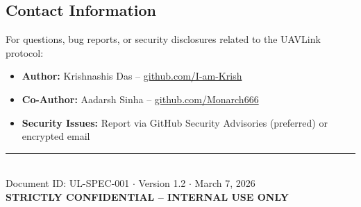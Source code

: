 \documentclass[11pt,a4paper]{article}
\begin{document}
\subsection*{Contact Information}

For questions, bug reports, or security disclosures related to the UAVLink protocol:

\begin{itemize}[noitemsep]
\item \textbf{Author:} Krishnashis Das -- \href{https://github.com/I-am-Krish}{github.com/I-am-Krish}
\item \textbf{Co-Author:} Aadarsh Sinha -- \href{https://github.com/Monarch666}{github.com/Monarch666}
\item \textbf{Security Issues:} Report via GitHub Security Advisories (preferred) or encrypted email
\end{itemize}

\vspace{1cm}

\begin{center}
\rule{0.5\textwidth}{0.4pt}\\[0.3cm]
{\footnotesize Document ID: UL-SPEC-001 $\cdot$ Version 1.2 $\cdot$ March 7, 2026}\\[0.2cm]
{\footnotesize\textcolor{alertred}{\textbf{STRICTLY CONFIDENTIAL -- INTERNAL USE ONLY}}}
\end{center}
\end{document}
